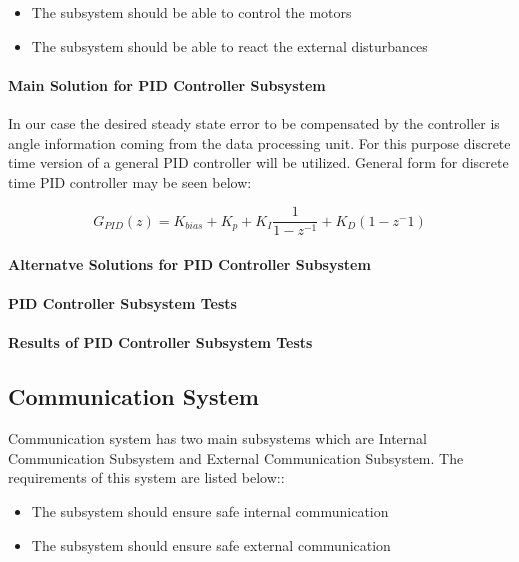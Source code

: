 \documentclass[a4paper,12pt]{article}
\begin{document}
	\begin{itemize}
		\item The subsystem should be able to control the motors
		\item The subsystem should be able to react the external disturbances
	\end{itemize} 
	
	\paragraph{Main Solution for PID Controller Subsystem}
	
	In our case the desired steady state error to be compensated by the controller is angle information coming from the data processing unit. For this purpose discrete time version of a general PID controller will be utilized. General form for discrete time PID controller may be seen below:
	
	$$ G_{PID}(z)=K_{bias}+K_p+K_I\frac{1}{1-z^{-1}}+K_D(1-z^-1)	$$
	
	
	
	
	\paragraph{Alternatve Solutions for PID Controller Subsystem}
	
	\paragraph{PID Controller Subsystem Tests}	
	
	\paragraph{Results of PID Controller Subsystem Tests}
	
	
	
	\subsection{Communication System}
	
	Communication system has two main subsystems which are Internal Communication Subsystem and External Communication  Subsystem. The requirements of this system are listed below::
	\begin{itemize}
		\item The subsystem should ensure safe internal communication
		\item The subsystem should ensure safe external communication
	\end{itemize}
	
\end{document}
